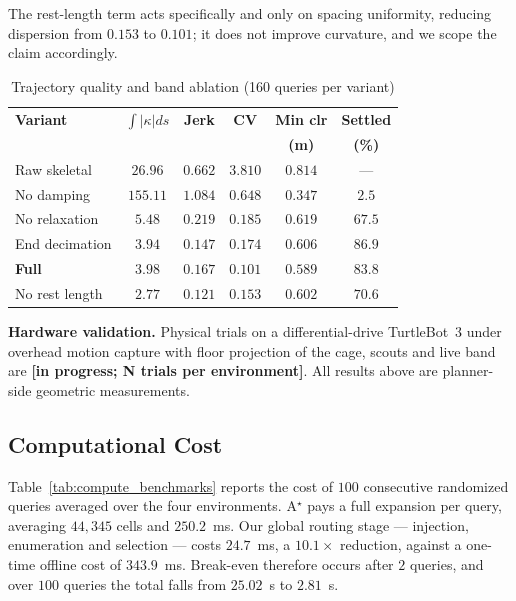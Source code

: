 \documentclass[conference]{IEEEtran}
\newcommand{\PH}[1]{{\color{red}\textbf{[#1]}}}
\begin{document}
The rest-length term acts specifically and only on spacing uniformity, reducing dispersion from $0.153$ to $0.101$; it does not improve curvature, and we scope the claim accordingly.

\begin{table}[htbp]
\caption{Trajectory quality and band ablation (160 queries per variant)}
\label{tab:kinematics}
\begin{center}
\begin{tabular}{@{}lccccc@{}}
\toprule
\textbf{Variant} & $\int|\kappa|ds$ & \textbf{Jerk} & \textbf{CV} & \textbf{Min clr} & \textbf{Settled} \\
& & & & \textbf{(m)} & \textbf{(\%)} \\ \midrule
Raw skeletal & $26.96$ & $0.662$ & $3.810$ & $0.814$ & --- \\
No damping & $155.11$ & $1.084$ & $0.648$ & $0.347$ & $2.5$ \\
No relaxation & $5.48$ & $0.219$ & $0.185$ & $0.619$ & $67.5$ \\
End decimation & $3.94$ & $0.147$ & $0.174$ & $0.606$ & $\mathbf{86.9}$ \\
\textbf{Full} & $3.98$ & $0.167$ & $\mathbf{0.101}$ & $0.589$ & $83.8$ \\
No rest length & $\mathbf{2.77}$ & $\mathbf{0.121}$ & $0.153$ & $0.602$ & $70.6$ \\ \bottomrule
\end{tabular}
\end{center}
\end{table}

\textbf{Hardware validation.} Physical trials on a differential-drive TurtleBot~3 under overhead motion capture with floor projection of the cage, scouts and live band are \PH{in progress; N trials per environment}. All results above are planner-side geometric measurements.

\subsection{Computational Cost}
\label{sec:res-cost}

Table~\ref{tab:compute_benchmarks} reports the cost of $100$ consecutive randomized queries averaged over the four environments. A$^\star$ pays a full expansion per query, averaging $44{,}345$ cells and $250.2$~ms. Our global routing stage --- injection, enumeration and selection --- costs $24.7$~ms, a $10.1\times$ reduction, against a one-time offline cost of $343.9$~ms. Break-even therefore occurs after $2$ queries, and over $100$ queries the total falls from $25.02$~s to $2.81$~s.
\end{document}
